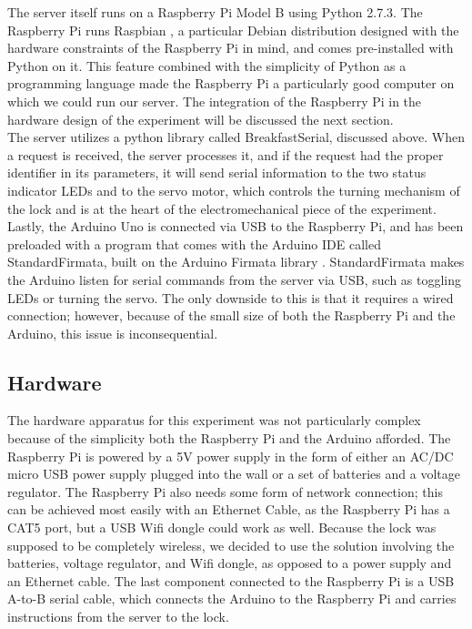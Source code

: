 \documentclass[10pt]{article}
\begin{document}
\begin{multicols}{2}
The server itself runs on a Raspberry Pi Model B using Python 2.7.3. The Raspberry Pi runs Raspbian \cite{raspbian}, a particular Debian distribution designed with the hardware constraints of the Raspberry Pi in mind, and comes pre-installed with Python on it. This feature combined with the simplicity of Python as a programming language made the Raspberry Pi a particularly good computer on which we could run our server. The integration of the Raspberry Pi in the hardware design of the experiment will be discussed the next section. \\

The server utilizes a python library called BreakfastSerial, discussed above. When a request is received, the server processes it, and if the request had the proper identifier in its parameters, it will send serial information to the two status indicator LEDs and to the servo motor, which controls the turning mechanism of the lock and is at the heart of the electromechanical piece of the experiment. \\

Lastly, the Arduino Uno is connected via USB to the Raspberry Pi, and has been preloaded with a program that comes with the Arduino IDE called StandardFirmata, built on the Arduino Firmata library \cite{arduinofirmata}. StandardFirmata makes the Arduino listen for serial commands from the server via USB, such as toggling LEDs or turning the servo. The only downside to this is that it requires a wired connection; however, because of the small size of both the Raspberry Pi and the Arduino, this issue is inconsequential. \\

\subsection{Hardware}

The hardware apparatus for this experiment was not particularly complex because of the simplicity both the Raspberry Pi and the Arduino afforded. The Raspberry Pi is powered by a 5V power supply in the form of either an AC/DC micro USB power supply plugged into the wall or a set of batteries and a voltage regulator. The Raspberry Pi also needs some form of network connection; this can be achieved most easily with an Ethernet Cable, as the Raspberry Pi has a CAT5 port, but a USB Wifi dongle could work as well. Because the lock was supposed to be completely wireless, we decided to use the solution involving the batteries, voltage regulator, and Wifi dongle, as opposed to a power supply and an Ethernet cable. The last component connected to the Raspberry Pi is a USB A-to-B serial cable, which connects the Arduino to the Raspberry Pi and carries instructions from the server to the lock. \\


\end{multicols}
\end{document}
